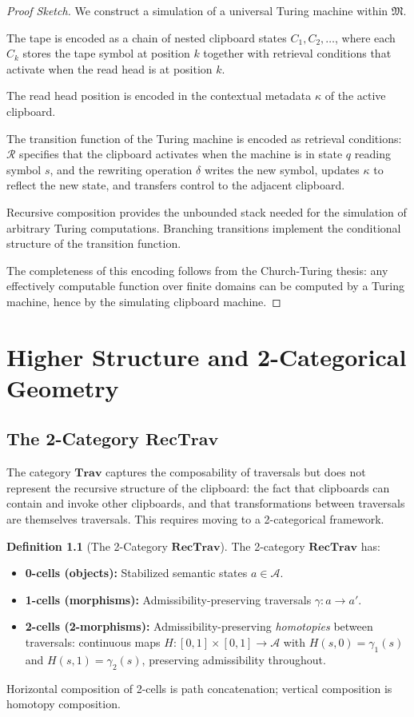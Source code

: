 \documentclass[12pt,oneside]{book}
\theoremstyle{plain}
\theoremstyle{definition}
\newtheorem{definition}[theorem]{Definition}
\theoremstyle{plain}
\newcommand{\Trav}{\mathbf{Trav}}
\newcommand{\RecTrav}{\mathbf{RecTrav}}
\newcommand{\cA}{\mathcal{A}}
\newcommand{\cR}{\mathcal{R}}
\newcommand{\fM}{\mathfrak{M}}
\begin{document}
\begin{proof}[Proof Sketch]
We construct a simulation of a universal Turing machine within $\fM$.

The tape is encoded as a chain of nested clipboard states $C_1, C_2, \ldots$, where each $C_k$ stores the tape symbol at position $k$ together with retrieval conditions that activate when the read head is at position $k$.

The read head position is encoded in the contextual metadata $\kappa$ of the active clipboard.

The transition function of the Turing machine is encoded as retrieval conditions: $\cR$ specifies that the clipboard activates when the machine is in state $q$ reading symbol $s$, and the rewriting operation $\delta$ writes the new symbol, updates $\kappa$ to reflect the new state, and transfers control to the adjacent clipboard.

Recursive composition provides the unbounded stack needed for the simulation of arbitrary Turing computations. Branching transitions implement the conditional structure of the transition function.

The completeness of this encoding follows from the Church-Turing thesis: any effectively computable function over finite domains can be computed by a Turing machine, hence by the simulating clipboard machine.
\end{proof}

\chapter{Higher Structure and 2-Categorical Geometry}
\label{ch:higher_cat}

\section{The 2-Category \texorpdfstring{$\RecTrav$}{RecTrav}}

The category $\Trav$ captures the composability of traversals but does not represent the recursive structure of the clipboard: the fact that clipboards can contain and invoke other clipboards, and that transformations between traversals are themselves traversals. This requires moving to a 2-categorical framework.

\begin{definition}[The 2-Category $\RecTrav$]
The 2-category $\RecTrav$ has:
\begin{itemize}[noitemsep]
\item \textbf{0-cells (objects):} Stabilized semantic states $a \in \cA$.
\item \textbf{1-cells (morphisms):} Admissibility-preserving traversals $\gamma : a \to a'$.
\item \textbf{2-cells (2-morphisms):} Admissibility-preserving \emph{homotopies} between traversals: continuous maps $H : [0,1] \times [0,1] \to \cA$ with $H(s,0) = \gamma_1(s)$ and $H(s,1) = \gamma_2(s)$, preserving admissibility throughout.
\end{itemize}
Horizontal composition of 2-cells is path concatenation; vertical composition is homotopy composition.
\end{definition}
\end{document}
